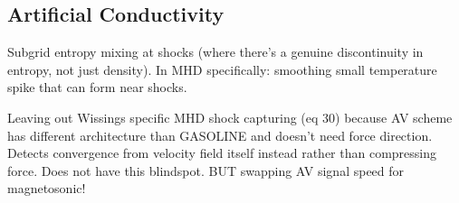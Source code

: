 

\subsection{Artificial Conductivity}
Subgrid entropy mixing at shocks (where there's a genuine discontinuity in entropy, not just density). In MHD specifically: smoothing small temperature spike that can form near shocks.

Leaving out Wissings specific MHD shock capturing (eq 30) because AV scheme has different architecture than GASOLINE and doesn't need force direction. Detects convergence from velocity field itself instead rather than compressing force. Does not have this blindspot. BUT swapping AV signal speed for magnetosonic! 

